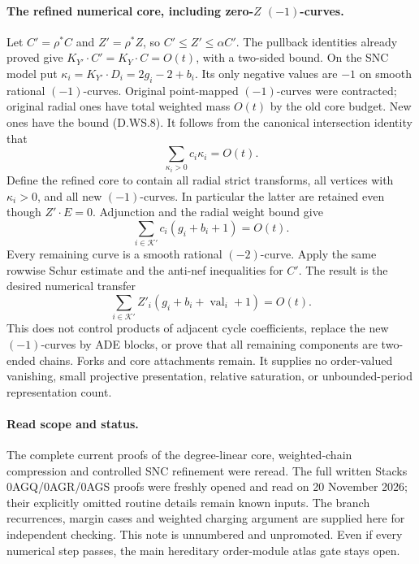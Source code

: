 \paragraph{The refined numerical core, including zero-$Z$ $(-1)$-curves.}
Let $C'=\rho^*C$ and $Z'=\rho^*Z$, so $C'\le Z'\le\alpha C'$.
The pullback identities already proved give
$K_{Y'}\cdot C'=K_Y\cdot C=O(t)$, with a two-sided bound.
On the SNC model put $\kappa_i=K_{Y'}\cdot D_i=2g_i-2+b_i$.
Its only negative values are $-1$ on smooth rational $(-1)$-curves.
Original point-mapped $(-1)$-curves were contracted; original radial
ones have total weighted mass $O(t)$ by the old core budget.  New
ones have the bound (D.WS.8).  It follows from the canonical
intersection identity that
\[
                 \sum_{\kappa_i>0}c_i\kappa_i=O(t).
\]
Define the refined core to contain all radial strict transforms, all
vertices with $\kappa_i>0$, and all new $(-1)$-curves.  In particular
the latter are retained even though $Z'\cdot E=0$.  Adjunction and
the radial weight bound give
\[
           \sum_{i\in\mathcal K'}c_i(g_i+b_i+1)=O(t).
\]
Every remaining curve is a smooth rational $(-2)$-curve.  Apply the
same rowwise Schur estimate and the anti-nef inequalities for $C'$.
The result is the desired numerical transfer
\[
 \sum_{i\in\mathcal K'}Z'_i
          (g_i+b_i+\operatorname{val}_i+1)=O(t).      \tag{D.WS.9}
\]
This does not control products of adjacent cycle coefficients, replace
the new $(-1)$-curves by ADE blocks, or prove that all remaining
components are two-ended chains.  Forks and core attachments remain.
It supplies no order-valued vanishing, small projective presentation,
relative saturation, or unbounded-period representation count.

\paragraph{Read scope and status.}
The complete current proofs of the degree-linear core, weighted-chain
compression and controlled SNC refinement were reread.  The full
written Stacks 0AGQ/0AGR/0AGS proofs were freshly opened and read on
20 November 2026; their explicitly omitted routine details remain
known inputs.  The branch recurrences, margin cases and weighted
charging argument are supplied here for independent checking.
This note is unnumbered and unpromoted.  Even if every numerical
step passes, the main hereditary order-module atlas gate stays open.
